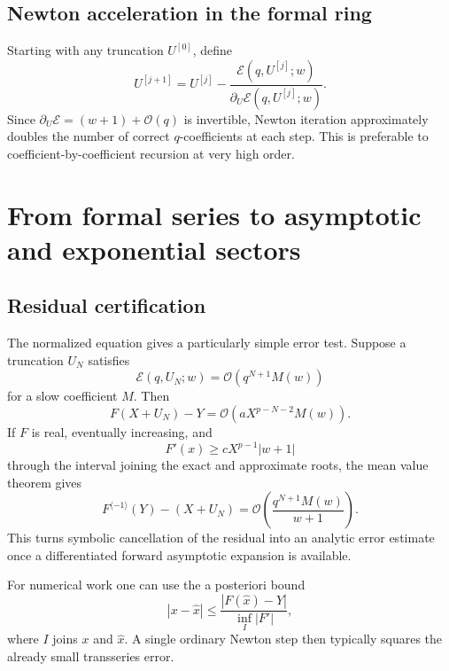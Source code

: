 \documentclass[11pt,a4paper]{article}
\numberwithin{equation}{section}
\theoremstyle{definition}
\theoremstyle{remark}
\newcommand{\Ord}{\mathcal O}
\newcommand{\cinv}{\langle-1\rangle}
\begin{document}
\subsection{Newton acceleration in the formal ring}

Starting with any truncation \(U^{[0]}\), define
\begin{equation}
 U^{[j+1]}=U^{[j]}-
 \frac{\mathscr E(q,U^{[j]};w)}
 {\partial_U\mathscr E(q,U^{[j]};w)}.
 \label{eq:formal-Newton}
\end{equation}
Since \(\partial_U\mathscr E=(w+1)+\Ord(q)\) is invertible, Newton iteration
approximately doubles the number of correct \(q\)-coefficients at each
step.  This is preferable to coefficient-by-coefficient recursion at very
high order.

\section{From formal series to asymptotic and exponential sectors}

\subsection{Residual certification}

The normalized equation gives a particularly simple error test.  Suppose a
truncation \(U_N\) satisfies
\begin{equation}
 \mathscr E(q,U_N;w)=\Ord(q^{N+1}M(w))
 \label{eq:E-residual-order}
\end{equation}
for a slow coefficient \(M\).  Then
\begin{equation}
 F(X+U_N)-Y
 =\Ord\!\left(aX^{p-N-2}M(w)\right).
 \label{eq:forward-residual-order}
\end{equation}
If \(F\) is real, eventually increasing, and
\begin{equation}
 F'(x)\ge cX^{p-1}|w+1|
 \label{eq:derivative-lower}
\end{equation}
through the interval joining the exact and approximate roots, the mean
value theorem gives
\begin{equation}
 F^{\cinv}(Y)-(X+U_N)
 =\Ord\!\left(\frac{q^{N+1}M(w)}{w+1}\right).
 \label{eq:inverse-error-general}
\end{equation}
This turns symbolic cancellation of the residual into an analytic error
estimate once a differentiated forward asymptotic expansion is available.

For numerical work one can use the a posteriori bound
\begin{equation}
 |x-\widehat x|\le
 \frac{|F(\widehat x)-Y|}{\inf_{I}|F'|},
 \label{eq:apost-bound}
\end{equation}
where \(I\) joins \(x\) and \(\widehat x\).  A single ordinary Newton step
then typically squares the already small transseries error.
\end{document}
